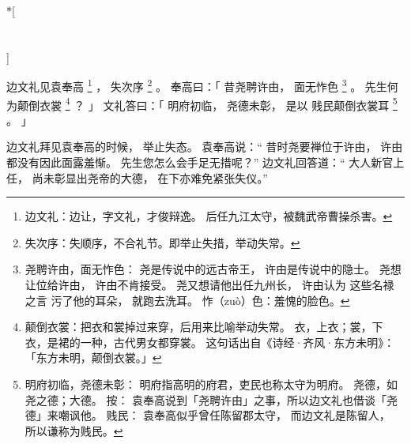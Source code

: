 
\switchcolumn[0]*[\section{}]

边文礼见袁奉高%
\footnote{%
    边文礼：边让，字文礼，才俊辩逸。
            后任九江太守，被魏武帝曹操杀害。
}%
，
失次序%
\footnote{%
    失次序：失顺序，不合礼节。即举止失措，举动失常。
}%
。
奉高曰：「
    昔尧聘许由，
    面无怍色%
    \footnote{%
        尧聘许由，面无怍色：
            尧是传说中的远古帝王，
            许由是传说中的隐士。
            尧想让位给许由，
            许由不肯接受。
            尧又想请他出任九州长，
            许由认为
            这些名禄之言
            污了他的耳朵，
            就跑去洗耳。
        怍（zuò）色：羞愧的脸色。
    }%
    。
    先生何为颠倒衣裳%
    \footnote{%
        颠倒衣裳：把衣和裳掉过来穿，后用来比喻举动失常。
                  衣，上衣；裳，下衣，是裙的一种，古代男女都穿裳。
                  这句话出自《诗经·齐风·东方未明》：
                  「东方未明，颠倒衣裳。」
    }%
    ？
」
文礼答曰：「
    明府初临，
    尧德未彰，
    是以
    贱民颠倒衣裳耳%
    \footnote{%
        明府初临，尧德未彰：
            明府指高明的府君，吏民也称太守为明府。
            尧德，如尧之德；大德。
            按：
            袁奉高说到「尧聘许由」之事，所以边文礼也借谈「尧德」来嘲讽他。
        贱民：
            袁奉高似乎曾任陈留郡太守，
            而边文礼是陈留人，
            所以谦称为贱民。
    }%
    。
」

\switchcolumn


边文礼拜见袁奉高的时候，
举止失态。
袁奉高说：“
 昔时尧要禅位于许由，
 许由都没有因此面露羞惭。
 先生您怎么会手足无措呢？”
边文礼回答道：“
 大人新官上任，
 尚未彰显出尧帝的大德，
 在下亦难免紧张失仪。”
